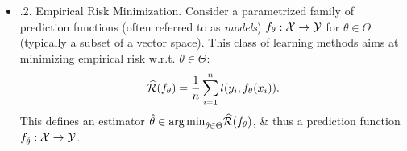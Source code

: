 \documentclass{article}
\newtheorem{problem}{Problem}
\begin{document}
\begin{enumerate}
\begin{itemize}
\begin{itemize}
\begin{itemize}
				\begin{problem}
					How would curve move when $n$ increases (assuming same balance between classes)?
				\end{problem}
				\item {.2. Empirical Risk Minimization.} Consider a parametrized family of prediction functions (often referred to as {\it models}) $f_\theta:{\cal X}\to{\cal Y}$ for $\theta\in\Theta$ (typically a subset of a vector space). This class of learning methods aims at minimizing empirical risk w.r.t. $\theta\in\Theta$:
				\begin{equation}
					\widehat{\cal R}(f_\theta) = \frac{1}{n}\sum_{i=1}^n l(y_i,f_\theta(x_i)).
				\end{equation}
				This defines an estimator $\hat{\theta}\in{\arg\min}_{\theta\in\Theta} \widehat{\cal R}(f_\theta)$, \& thus a prediction function $f_{\hat{\theta}}:{\cal X}\to{\cal Y}$.
				

\end{itemize}
\end{itemize}
\end{itemize}
\end{enumerate}
\end{document}
